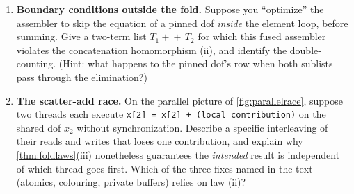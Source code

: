 \begin{enumerate}[nosep]
  \item \textbf{Boundary conditions outside the fold.} Suppose you ``optimize'' the
  assembler to skip the equation of a pinned dof \emph{inside} the element loop,
  before summing. Give a two-term list $T_1\!+\!\!+\,T_2$ for which this fused
  assembler violates the concatenation homomorphism (ii), and identify the double-
  counting. (Hint: what happens to the pinned dof's row when both sublists pass
  through the elimination?)

  \item \textbf{The scatter-add race.} On the parallel picture of
  \cref{fig:parallelrace}, suppose two threads each execute
  \texttt{x[2] = x[2] + (local contribution)} on the shared dof $x_2$ without
  synchronization. Describe a specific interleaving of their reads and writes that
  loses one contribution, and explain why \cref{thm:foldlaws}(iii) nonetheless
  guarantees the \emph{intended} result is independent of which thread goes first.
  Which of the three fixes named in the text (atomics, colouring, private buffers)
  relies on law (ii)?
\end{enumerate}
